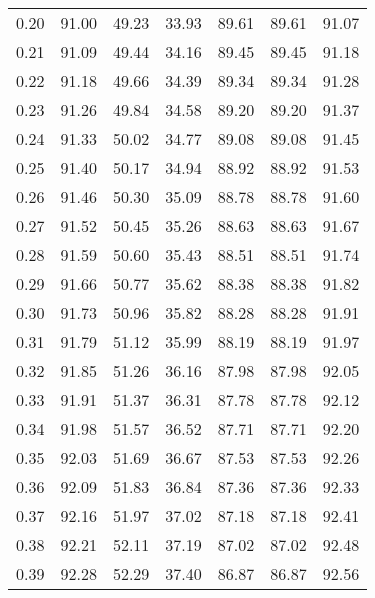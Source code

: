 \begin{tabular}{|c|c|c|c|c|c|c|}
      0.20 &     91.00 &     49.23 &      33.93 &   89.61 &      89.61 &         91.07 \\
      0.21 &     91.09 &     49.44 &      34.16 &   89.45 &      89.45 &         91.18 \\
      0.22 &     91.18 &     49.66 &      34.39 &   89.34 &      89.34 &         91.28 \\
      0.23 &     91.26 &     49.84 &      34.58 &   89.20 &      89.20 &         91.37 \\
      0.24 &     91.33 &     50.02 &      34.77 &   89.08 &      89.08 &         91.45 \\
      0.25 &     91.40 &     50.17 &      34.94 &   88.92 &      88.92 &         91.53 \\
      0.26 &     91.46 &     50.30 &      35.09 &   88.78 &      88.78 &         91.60 \\
      0.27 &     91.52 &     50.45 &      35.26 &   88.63 &      88.63 &         91.67 \\
      0.28 &     91.59 &     50.60 &      35.43 &   88.51 &      88.51 &         91.74 \\
      0.29 &     91.66 &     50.77 &      35.62 &   88.38 &      88.38 &         91.82 \\
      0.30 &     91.73 &     50.96 &      35.82 &   88.28 &      88.28 &         91.91 \\
      0.31 &     91.79 &     51.12 &      35.99 &   88.19 &      88.19 &         91.97 \\
      0.32 &     91.85 &     51.26 &      36.16 &   87.98 &      87.98 &         92.05 \\
      0.33 &     91.91 &     51.37 &      36.31 &   87.78 &      87.78 &         92.12 \\
      0.34 &     91.98 &     51.57 &      36.52 &   87.71 &      87.71 &         92.20 \\
      0.35 &     92.03 &     51.69 &      36.67 &   87.53 &      87.53 &         92.26 \\
      0.36 &     92.09 &     51.83 &      36.84 &   87.36 &      87.36 &         92.33 \\
      0.37 &     92.16 &     51.97 &      37.02 &   87.18 &      87.18 &         92.41 \\
      0.38 &     92.21 &     52.11 &      37.19 &   87.02 &      87.02 &         92.48 \\
      0.39 &     92.28 &     52.29 &      37.40 &   86.87 &      86.87 &         92.56 \\

\end{tabular}

